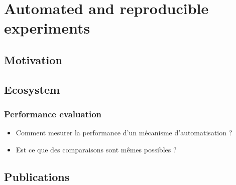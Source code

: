 
\chapter{Automated and reproducible experiments} %
\label{cha:automated_and_reproducible_experiments}

\minitoc

\section{Motivation} %
\label{sec:automation_motivation}

\cite{leone2013makesense}
\lipsum


\section{Ecosystem} %
\label{sec:automation_ecosystem}

\lipsum

\subsection{Performance evaluation} %
\label{sub:performance_evaluation}

\begin{itemize}
	\item Comment mesurer la performance d'un mécanisme d'automatisation ?
	\item Est ce que des comparaisons sont mêmes possibles ?
\end{itemize}



\section{Publications} %
\label{sec:automated_publications}


